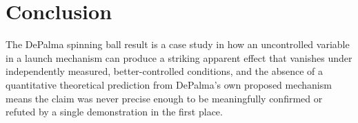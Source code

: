\documentclass[11pt]{article}
\begin{document}
\section{Conclusion}

The DePalma spinning ball result is a case study in how an uncontrolled variable in a launch mechanism can produce a striking apparent effect that vanishes under independently measured, better-controlled conditions, and the absence of a quantitative theoretical prediction from DePalma's own proposed mechanism means the claim was never precise enough to be meaningfully confirmed or refuted by a single demonstration in the first place.
\end{document}
